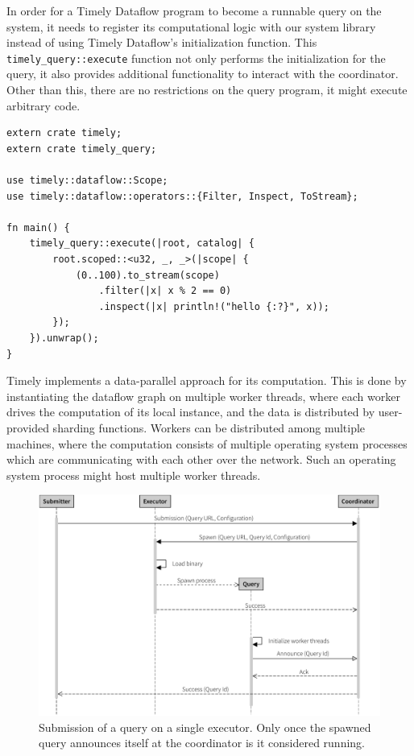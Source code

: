 In order for a Timely Dataflow program to become a runnable query on the system,
it needs to register its computational logic with our system library instead of
using Timely Dataflow's initialization function. This
\lstinline{timely_query::execute} function not only performs the initialization
for the query, it also provides additional functionality to interact with the
coordinator. Other than this, there are no restrictions on the query program,
it might execute arbitrary code. %

\begin{lstlisting}[caption={[Example query.]Example query which creates a stream of integers,
filters out all odd numbers and then prints the rest.}]
extern crate timely;
extern crate timely_query;

use timely::dataflow::Scope;
use timely::dataflow::operators::{Filter, Inspect, ToStream};

fn main() {
    timely_query::execute(|root, catalog| {
        root.scoped::<u32, _, _>(|scope| {
            (0..100).to_stream(scope)
                .filter(|x| x % 2 == 0)
                .inspect(|x| println!("hello {:?}", x));
        });
    }).unwrap();
}
\end{lstlisting}

Timely implements a data-parallel approach for its computation. This is done by
instantiating the dataflow graph on multiple worker threads, where each worker
drives the computation of its local instance, and the data is distributed by
user-provided sharding functions. Workers can be distributed among multiple
machines, where the computation consists of multiple operating system processes
which are communicating with each other over the network. Such an
operating system process might host multiple worker threads.

\begin{figure}[htb]
  \centering
    \includegraphics[width=1\textwidth]{figures/spawn_singleprocess}
  \caption[Query submission with single process.]{Submission of a query on a single executor.
  Only once the spawned query announces itself at the coordinator is it considered running.}
  \label{fig:subsingle}
\end{figure}

